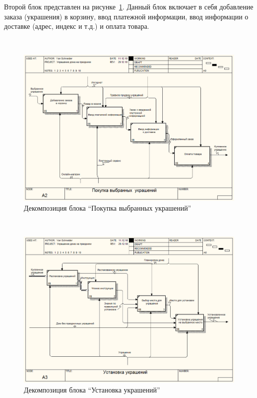 Второй блок представлен на рисунке~\ref{fig:analysis:functionalModel:a2_buy}. Данный блок включает в себя добавление заказа (украшения) в корзину, ввод платежной информации, ввод информации о доставке (адрес, индекс и т.д.) и оплата товара.

 ~
\begin{figure}[H]
\centering
	\includegraphics[scale=0.45]{figures/functionalModel/a2_buy.jpg}
	\caption{Декомпозиция блока ``Покупка выбранных украшений''}
	\label{fig:analysis:functionalModel:a2_buy}
\end{figure}

 ~
\begin{figure}[H]
\centering
	\includegraphics[scale=0.45]{figures/functionalModel/a3_install.jpg}
	\caption{Декомпозиция блока ``Установка украшений''}
	\label{fig:analysis:functionalModel:a3_install}
\end{figure}

